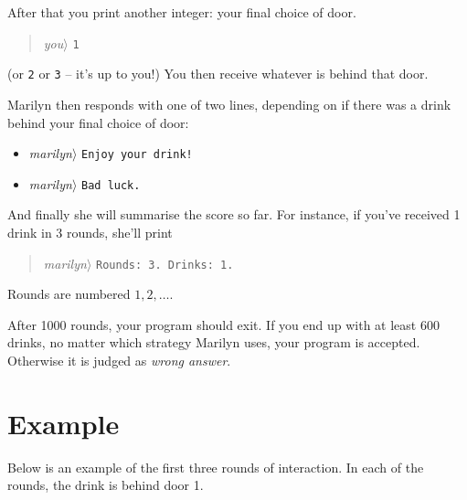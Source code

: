 After that you print another integer: your final choice of door.
\begin{quote}\emph{you}$\rangle$ \verb}1}\end{quote}
  (or \verb}2} or \verb}3} -- it's up to you!)
You then receive whatever is behind that door.

Marilyn then responds with one of two lines, depending on if there was a drink behind your final choice of door:
\begin{itemize}
\item \emph{marilyn}$\rangle$ \verb}Enjoy your drink!}
\item \emph{marilyn}$\rangle$ \verb}Bad luck.}
\end{itemize}
And finally she will summarise the score so far.
For instance, if you’ve received 1 drink in 3 rounds, she’ll print
\begin{quote}\emph{marilyn}$\rangle$ \verb}Rounds: 3. Drinks: 1.}\end{quote}
Rounds are numbered $1, 2, \ldots$.

After 1000 rounds, your program should exit.
If you end up with at least 600 drinks, no matter which strategy Marilyn uses, your program is accepted.
Otherwise it is judged as \emph{wrong answer}.


\section*{Example}

Below is an example of the first three rounds of interaction.
In each of the rounds, the drink is behind door 1.
